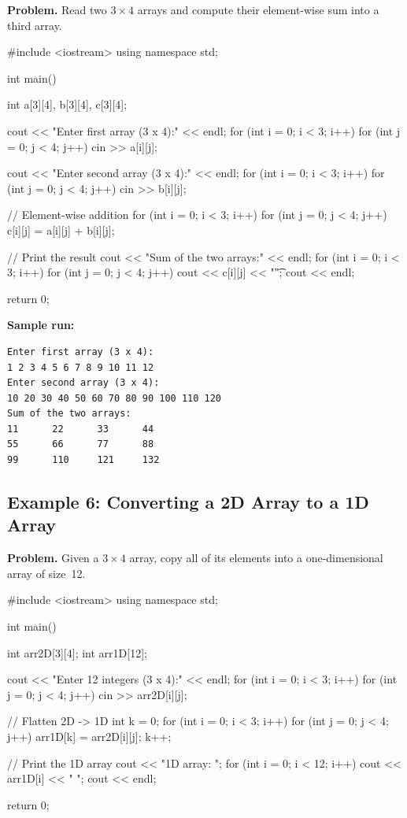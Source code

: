\textbf{Problem.} Read two $3 \times 4$ arrays and compute their
element-wise sum into a third array.

\begin{cppcode}
#include <iostream>
using namespace std;

int main() {
    int a[3][4], b[3][4], c[3][4];

    cout << "Enter first array (3 x 4):" << endl;
    for (int i = 0; i < 3; i++)
        for (int j = 0; j < 4; j++)
            cin >> a[i][j];

    cout << "Enter second array (3 x 4):" << endl;
    for (int i = 0; i < 3; i++)
        for (int j = 0; j < 4; j++)
            cin >> b[i][j];

    // Element-wise addition
    for (int i = 0; i < 3; i++)
        for (int j = 0; j < 4; j++)
            c[i][j] = a[i][j] + b[i][j];

    // Print the result
    cout << "Sum of the two arrays:" << endl;
    for (int i = 0; i < 3; i++) {
        for (int j = 0; j < 4; j++) {
            cout << c[i][j] << "\t";
        }
        cout << endl;
    }

    return 0;
}
\end{cppcode}

\textbf{Sample run:}
\begin{verbatim}
Enter first array (3 x 4):
1 2 3 4 5 6 7 8 9 10 11 12
Enter second array (3 x 4):
10 20 30 40 50 60 70 80 90 100 110 120
Sum of the two arrays:
11      22      33      44
55      66      77      88
99      110     121     132
\end{verbatim}

\subsection{Example 6: Converting a 2D Array to a 1D Array}

\textbf{Problem.} Given a $3 \times 4$ array, copy all of its elements
into a one-dimensional array of size~12.

\begin{cppcode}
#include <iostream>
using namespace std;

int main() {
    int arr2D[3][4];
    int arr1D[12];

    cout << "Enter 12 integers (3 x 4):" << endl;
    for (int i = 0; i < 3; i++)
        for (int j = 0; j < 4; j++)
            cin >> arr2D[i][j];

    // Flatten 2D -> 1D
    int k = 0;
    for (int i = 0; i < 3; i++) {
        for (int j = 0; j < 4; j++) {
            arr1D[k] = arr2D[i][j];
            k++;
        }
    }

    // Print the 1D array
    cout << "1D array: ";
    for (int i = 0; i < 12; i++) {
        cout << arr1D[i] << " ";
    }
    cout << endl;

    return 0;
}
\end{cppcode}

